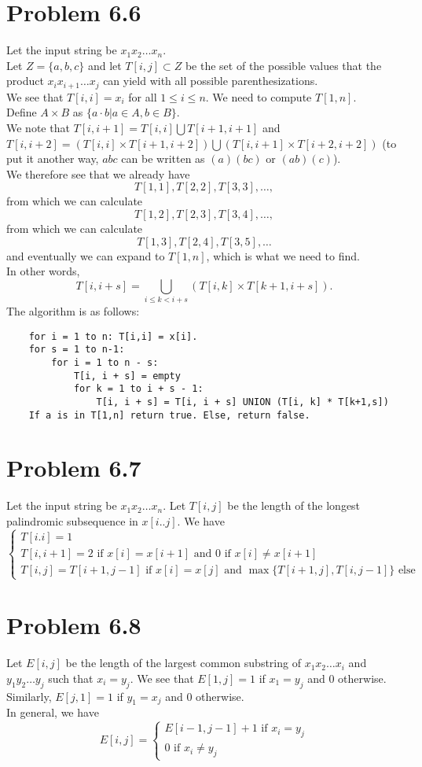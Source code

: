 \documentclass[12pt]{article}
\begin{document}
\section{Problem 6.6}
Let the input string be $x_1 x_2 \ldots x_n$. \\
Let $Z = \{a,b,c\}$ and let $T[i,j] \subset Z$ be the set of the possible values that the product $x_i x_{i+1} \ldots x_{j}$ can yield with all possible parenthesizations. \\
We see that $T[i,i] = x_i$ for all $1 \le i \le n$. We need to compute $T[1,n]$. \\
Define $A \times B$ as $\{ a \cdot b | a \in A, b \in B\}$. \\
We note that $T[i, i+1] = T[i,i] \bigcup T[i+1, i+1]$ and $T[i,i+2] = (T[i,i] \times T[i+1, i+2]) \bigcup (T[i,i+1] \times T[i+2,i+2])$ (to put it another way, $abc$ can be written as $(a)(bc)$ or $(ab)(c)$). \\
We therefore see that we already have $$T[1,1], T[2,2], T[3,3], \ldots,$$
from which we can calculate $$T[1,2], T[2,3], T[3,4], \ldots,$$
from which we can calculate $$T[1,3], T[2,4], T[3,5], \ldots $$
and eventually we can expand to $T[1,n]$, which is what we need to find.\\
In other words, $$T[i, i + s] = \bigcup_{i \le k < i + s} (T[i,k] \times T[k+1, i + s]).$$
The algorithm is as follows:
\begin{lstlisting}
	for i = 1 to n: T[i,i] = x[i].
	for s = 1 to n-1:
		for i = 1 to n - s:
			T[i, i + s] = empty
			for k = 1 to i + s - 1:
				T[i, i + s] = T[i, i + s] UNION (T[i, k] * T[k+1,s])
	If a is in T[1,n] return true. Else, return false.
\end{lstlisting}

\section{Problem 6.7}
Let the input string be $x_1 x_2 \ldots x_n$. Let $T[i,j]$ be the length of the longest palindromic subsequence in $x[i..j]$. We have $$\begin{cases} T[i.i] = 1 \\ T[i,i+1] = 2 \text{ if } x[i] = x[i+1] \text{ and } 0 \text{ if } x[i] \ne x[i+1] \\ T[i,j] = T[i+1,j-1] \text{ if } x[i] = x[j] \text{ and } \max \{T[i+1,j], T[i,j-1]\} \text{ else} \end{cases}$$

\section{Problem 6.8}
Let $E[i,j]$ be the length of the largest common substring of $x_1 x_2 \ldots x_i$ and $y_1 y_2 \ldots y_j$ such that $x_i = y_j$. We see that $E[1,j] = 1$ if $x_1 = y_j$ and $0$ otherwise. Similarly, $E[j,1] = 1$ if $y_1 = x_j$ and $0$ otherwise.\\
In general, we have $$E[i,j] = \begin{cases} E[i-1,j-1] + 1 \text{ if } x_i = y_j \\ 0 \text{ if } x_i \ne y_j \end{cases}$$
\end{document}
